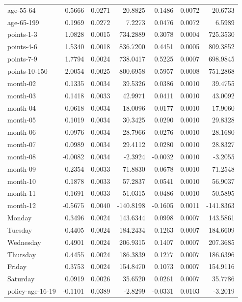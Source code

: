 \documentclass[10pt]{article}
\begin{document}
\begin{table}[ht]
\begin{tabular}{lrrrrrr}
  age-55-64 & 0.5666 & 0.0271 & 20.8825 & 0.1486 & 0.0072 & 20.6733 \\ 
  age-65-199 & 0.1969 & 0.0272 & 7.2273 & 0.0476 & 0.0072 & 6.5989 \\ 
  points-1-3 & 1.0828 & 0.0015 & 734.2889 & 0.3078 & 0.0004 & 725.3530 \\ 
  points-4-6 & 1.5340 & 0.0018 & 836.7200 & 0.4451 & 0.0005 & 809.3852 \\ 
  points-7-9 & 1.7794 & 0.0024 & 738.0417 & 0.5225 & 0.0007 & 698.9845 \\ 
  points-10-150 & 2.0054 & 0.0025 & 800.6958 & 0.5957 & 0.0008 & 751.2868 \\ 
  month-02 & 0.1335 & 0.0034 & 39.5326 & 0.0386 & 0.0010 & 39.4755 \\ 
  month-03 & 0.1418 & 0.0033 & 42.9971 & 0.0411 & 0.0010 & 43.0092 \\ 
  month-04 & 0.0618 & 0.0034 & 18.0096 & 0.0177 & 0.0010 & 17.9060 \\ 
  month-05 & 0.1019 & 0.0034 & 30.3425 & 0.0290 & 0.0010 & 29.8328 \\ 
  month-06 & 0.0976 & 0.0034 & 28.7966 & 0.0276 & 0.0010 & 28.1680 \\ 
  month-07 & 0.0989 & 0.0034 & 29.4112 & 0.0280 & 0.0010 & 28.8327 \\ 
  month-08 & -0.0082 & 0.0034 & -2.3924 & -0.0032 & 0.0010 & -3.2055 \\ 
  month-09 & 0.2354 & 0.0033 & 71.8830 & 0.0678 & 0.0010 & 71.2548 \\ 
  month-10 & 0.1878 & 0.0033 & 57.2837 & 0.0541 & 0.0010 & 56.9037 \\ 
  month-11 & 0.1691 & 0.0033 & 51.0315 & 0.0486 & 0.0010 & 50.5895 \\ 
  month-12 & -0.5675 & 0.0040 & -140.8198 & -0.1605 & 0.0011 & -141.8363 \\ 
  Monday & 0.3496 & 0.0024 & 143.6344 & 0.0998 & 0.0007 & 143.5861 \\ 
  Tuesday & 0.4405 & 0.0024 & 184.2434 & 0.1263 & 0.0007 & 184.6609 \\ 
  Wednesday & 0.4901 & 0.0024 & 206.9315 & 0.1407 & 0.0007 & 207.3685 \\ 
  Thursday & 0.4455 & 0.0024 & 186.3839 & 0.1277 & 0.0007 & 186.6396 \\ 
  Friday & 0.3753 & 0.0024 & 154.8470 & 0.1073 & 0.0007 & 154.9116 \\ 
  Saturday & 0.0919 & 0.0026 & 35.6520 & 0.0261 & 0.0007 & 35.7786 \\ 
  policy-age-16-19 & -0.1101 & 0.0389 & -2.8299 & -0.0331 & 0.0103 & -3.2019 \\ 

\end{tabular}
\end{table}
\end{document}
